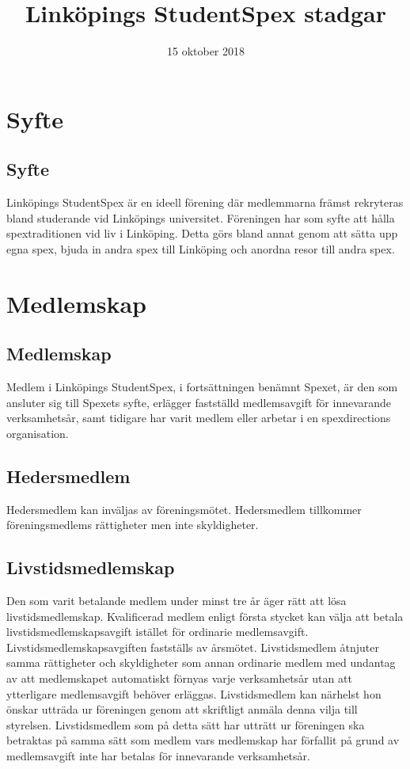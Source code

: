 \documentclass[a4paper]{article}
\title{Linköpings StudentSpex stadgar}
\author{}
\date{15 oktober 2018}
\begin{document}
\maketitle

\section{Syfte}
\subsection{Syfte}
Linköpings StudentSpex är en ideell förening där medlemmarna främst rekryteras bland studerande vid Linköpings universitet. Föreningen har som syfte att hålla spextraditionen vid liv i Linköping. Detta görs bland annat genom att sätta upp egna spex, bjuda in andra spex till Linköping och anordna resor till andra spex.

\section{Medlemskap}
\subsection{Medlemskap}
Medlem i Linköpings StudentSpex, i fortsättningen benämnt Spexet, är den som ansluter sig till Spexets syfte, erlägger fastställd medlemsavgift för innevarande verksamhetsår, samt tidigare har varit medlem eller arbetar i en spexdirections organisation.

\subsection{Hedersmedlem}
Hedersmedlem kan inväljas av föreningsmötet. Hedersmedlem tillkommer föreningsmedlems rättigheter men inte skyldigheter.

\subsection{Livstidsmedlemskap}
Den som varit betalande medlem under minst tre år äger rätt att lösa livstidsmedlemskap. Kvalificerad medlem enligt första stycket kan välja att betala livstidsmedlemskapsavgift istället för ordinarie medlemsavgift. \newline
\newline
Livstidsmedlemskapsavgiften fastställs av årsmötet.\newline
\newline
Livstidsmedlem åtnjuter samma rättigheter och skyldigheter som annan ordinarie medlem med undantag av att medlemskapet automatiskt förnyas varje verksamhetsår utan att ytterligare medlemsavgift behöver erläggas.\newline
\newline
Livstidsmedlem kan närhelst hon önskar utträda ur föreningen genom att skriftligt anmäla denna vilja till styrelsen. Livstidsmedlem som på detta sätt har utträtt ur föreningen ska betraktas på samma sätt som medlem vars medlemskap har förfallit på grund av medlemsavgift inte har betalas för innevarande verksamhetsår.
\end{document}
